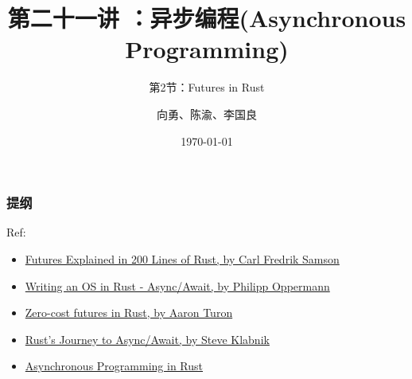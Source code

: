 


\title[第21讲]{第二十一讲 ：异步编程(Asynchronous Programming)} %
\subtitle{第2节：Futures in Rust}
\author{向勇、陈渝、李国良} %
\date{\today} %



\begin{frame}
\titlepage %
\end{frame}

\begin{frame}
\frametitle{提纲} %
\tableofcontents %

\tiny
Ref:
\begin{itemize}
	\item \href{https://cfsamson.github.io/books-futures-explained/}{Futures Explained in 200 Lines of Rust, by Carl Fredrik Samson}
	\item \href{https://os.phil-opp.com/async-await/}{Writing an OS in Rust - Async/Await, by Philipp Oppermann}
	\item \href{https://aturon.github.io/tech/2016/08/11/futures/}{Zero-cost futures in Rust, by Aaron Turon}
	\item \href{https://www.infoq.com/presentations/rust-2019/}{Rust’s Journey to Async/Await, by Steve Klabnik}
	\item \href{https://rust-lang.github.io/async-book/index.html}{Asynchronous Programming in Rust}
\end{itemize}


\end{frame}
